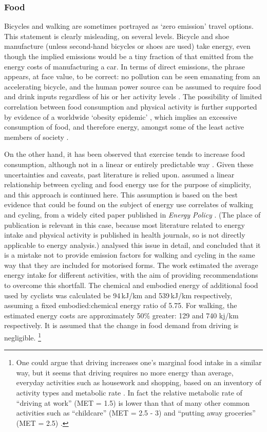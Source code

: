 \documentclass[a4paper, 11pt, twoside]{Thesis}
\begin{document}
\subsubsection{Food}  
Bicycles and walking are sometimes portrayed as `zero emission' travel options.
This statement is clearly misleading, on several levels. Bicycle and shoe
manufacture (unless second-hand bicycles or shoes are used) take energy,
even though the implied emissions would be a tiny fraction of that emitted
from the energy costs of manufacturing a car.
In terms of direct emissions, the phrase appears, at face value, to be correct:
no pollution can be seen emanating from an accelerating bicycle, and the human
power source can be assumed to require food and drink inputs regardless of his
or her activity levels \citep{Brand2006}.
The possibility of limited correlation between food consumption and physical
activity is further supported by evidence of a worldwide `obesity epidemic'
\citep{caballero2007global}, which
implies an excessive consumption of food, and therefore energy,
amongst some of the least active members of society \citep{Michaelowa2008}.

On the other hand, it has been observed that exercise tends to increase food
consumption, although not in a linear or entirely predictable way \citep{Melzer2005}.
Given these uncertainties and caveats, past literature is relied upon.
\citet{Lovelace2011-assessing} assumed a linear 
relationship between cycling and food energy use for the purpose of simplicity,
and this approach is continued here.
This assumption is based on the best evidence that could be found on the
subject of energy use correlates of walking and cycling,
from a widely cited paper published in \emph{Energy Policy}
\citep{Coley2002}. (The place of publication
is relevant in this case, because most literature related to energy intake and
physical activity is published in health journals, so is not directly
applicable to energy analysis.)
\citet{Coley2002} analysed this issue in detail, and concluded that it
is a mistake not to provide emission factors for walking and cycling in the
same way that they are included for motorised forms. The work estimated the
average energy intake for different activities, with the aim of providing
recommendations to overcome this shortfall.
The chemical and embodied energy of additional food used by
cyclists was calculated be 94\,kJ/km and 539\,kJ/km respectively,
assuming a fixed embodied:chemical energy ratio of 5.75.
For walking, the estimated energy costs are approximately 50\% greater:
129 and 740 kj/km respectively.
It is assumed that the change in food demand from driving is negligible.
\footnote{One
could argue that driving increases one's marginal food intake in
a similar way, but it seems that driving requires no more energy than average,
everyday activities such as housework and shopping, based on an inventory of
activity types and metabolic rate \citep{Ainsworth2000}. In fact the relative
metabolic rate of ``driving at work'' (MET = 1.5) is lower than that of many
other common activities such as ``childcare'' (MET = 2.5 - 3) and ``putting
away groceries'' (MET = 2.5) \citep{Ainsworth2003}.
}
\end{document}
